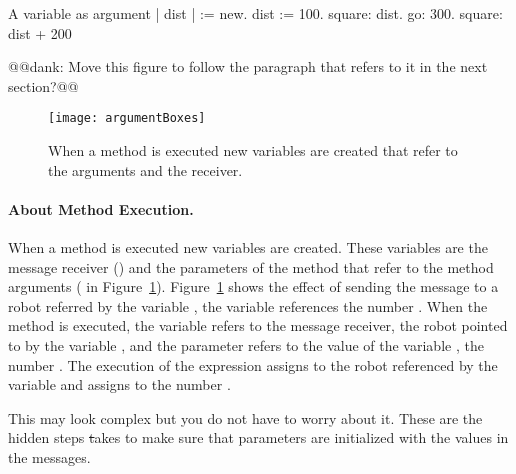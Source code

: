 \begin{scriptwithtitle}{A variable as argument}\label{scr:varasArg}
| \caro dist |
\caro := \Turtle new.
dist := 100. 
\caro square: dist.
\caro go: 300.
\caro square: dist + 200
\end{scriptwithtitle}

@@dank: Move this figure to follow the paragraph that refers to it in the next section?@@
\begin{figure}[h]
\begin{center}\texttt{[image: argumentBoxes]}\end{center}
\caption{When a method is executed\newcommand{\add}[1]{,} new variables are created that refer to the arguments and the receiver. \label{fig:argumentswithboxes}}
\end{figure}


\paragraph{About Method Execution.}
\newcommand{\replace}[2]{In fact when}{When} a method is executed new variables are created. These variables are the message receiver () and the parameters of the method that refer to the method \newcommand{\replace}[2]{argument}{arguments} (  in Figure~\ref{fig:argumentswithboxes}). Figure~\ref{fig:argumentswithboxes} shows the effect of sending the message  to a robot referred \newcommand{\add}[1]{to} by the variable \newcommand{\replace}[2]{\ct{pica}}{\ct{\caro}}, \newcommand{\add}[1]{when} the variable  \newcommand{\replace}[2]{referencing}{references} the number . When the method  is executed, the variable  refers to the message receiver, \ie the robot pointed to by the variable \newcommand{\replace}[2]{\ct{pica}}{\ct{\caro}}, and the parameter  refers to the value of the variable , \ie the number . 
The execution of the expression  assigns to \self the robot referenced by the variable \daly\newcommand{\add}[1]{,} and \newcommand{\replace}[2]{\ct{200} to the value of \ct{size}}{assigns to  the number }. 

This may look complex but you do not have to \newcommand{\replace}[2]{worry: Parameters are variables that}{worry about it. These are the hidden steps \st takes to make sure that parameters} are initialized with the values \newcommand{\replace}[2]{of}{in} the messages.



